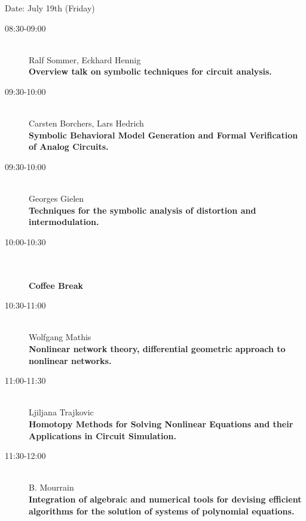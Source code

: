 Date: July 19th (Friday) 

\begin{description}
\item[08:30-09:00] \ \\
  Ralf Sommer, Eckhard Hennig\\
  {\bf Overview talk on symbolic techniques for circuit analysis.} 
\item[09:30-10:00] \ \\
  Carsten Borchers, Lars Hedrich\\
  {\bf Symbolic Behavioral Model Generation and Formal Verification of Analog Circuits.
 } 
\item[09:30-10:00] \ \\
  Georges Gielen
\\
  {\bf Techniques for the symbolic analysis of distortion and intermodulation.
} 
\item[10:00-10:30] \ \\
  \\
  {\bf Coffee Break } 
\item[10:30-11:00] \ \\
  Wolfgang Mathis\\
  {\bf Nonlinear network theory, differential geometric approach to nonlinear networks.} 
\item[11:00-11:30] \ \\
  Ljiljana Trajkovic\\
  {\bf Homotopy Methods for Solving Nonlinear Equations and their Applications in Circuit
    Simulation.
} 
\item[11:30-12:00] \ \\
  B. Mourrain\\
  {\bf Integration of algebraic and numerical tools for devising efficient algorithms for the
    solution of systems of polynomial equations.} 
\end{description}

